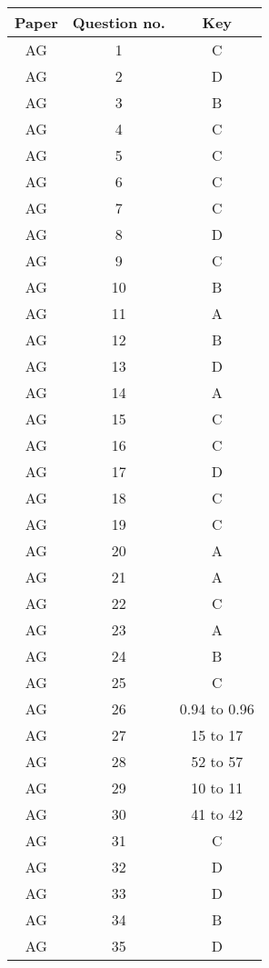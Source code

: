 \noindent
\begin{minipage}[t]{0.45\textwidth}
\begin{tabular}{|c|c|c|}
\hline
Paper & Question no. & Key \\ \hline
AG & 1  & C \\ \hline
AG & 2  & D \\ \hline
AG & 3  & B \\ \hline
AG & 4  & C \\ \hline
AG & 5  & C \\ \hline
AG & 6  & C \\ \hline
AG & 7  & C \\ \hline
AG & 8  & D \\ \hline
AG & 9  & C \\ \hline
AG & 10 & B \\ \hline
AG & 11 & A \\ \hline
AG & 12 & B \\ \hline
AG & 13 & D \\ \hline
AG & 14 & A \\ \hline
AG & 15 & C \\ \hline
AG & 16 & C \\ \hline
AG & 17 & D \\ \hline
AG & 18 & C \\ \hline
AG & 19 & C \\ \hline
AG & 20 & A \\ \hline
AG & 21 & A \\ \hline
AG & 22 & C \\ \hline
AG & 23 & A \\ \hline
AG & 24 & B \\ \hline
AG & 25 & C \\ \hline
AG & 26 & 0.94 to 0.96 \\ \hline
AG & 27 & 15 to 17 \\ \hline
AG & 28 & 52 to 57 \\ \hline
AG & 29 & 10 to 11 \\ \hline
AG & 30 & 41 to 42 \\ \hline
AG & 31 & C \\ \hline
AG & 32 & D \\ \hline
AG & 33 & D \\ \hline
AG & 34 & B \\ \hline
AG & 35 & D \\ \hline
\end{tabular}
\end{minipage}\hfill